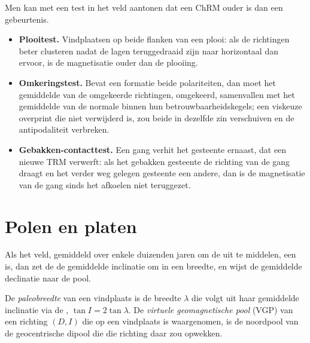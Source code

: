 \begin{method}\label{met:b3:palaeomagnetism:tests}
Men kan met een test in het veld aantonen dat een ChRM ouder is dan een gebeurtenis.
\begin{itemize}
  \item \textbf{Plooitest.} Vindplaatsen op beide flanken van een plooi: als de richtingen
        beter clusteren nadat de lagen teruggedraaid zijn naar horizontaal dan
        ervoor, is de magnetisatie ouder dan de plooiing.
  \item \textbf{Omkeringstest.} Bevat een formatie beide polariteiten, dan moet het gemiddelde
        van de omgekeerde richtingen, omgekeerd, samenvallen met het gemiddelde van
        de normale binnen hun betrouwbaarheidskegels; een viskeuze overprint die
        niet verwijderd is, zou beide in dezelfde zin verschuiven en de antipodaliteit verbreken.
  \item \textbf{Gebakken-contacttest.} Een gang verhit het gesteente ernaast,
        dat een nieuwe TRM verwerft: als het gebakken gesteente de richting van de gang
        draagt en het verder weg gelegen gesteente een andere, dan is de magnetisatie
        van de gang sinds het afkoelen niet teruggezet.
\end{itemize}
\end{method}

\section{Polen en platen}

Als het veld, gemiddeld over enkele duizenden jaren om de  uit te middelen, een  is, dan zet de 
de gemiddelde inclinatie om in een breedte, en wijst de gemiddelde declinatie naar de pool.

\begin{definition}\label{def:b3:palaeomagnetism:vgp}
De \emph{paleobreedte} van een vindplaats is de breedte
$\lambda$ die volgt uit haar gemiddelde inclinatie via de , $\tan I =
2\tan\lambda$. De \emph{virtuele geomagnetische pool}
(VGP) van een richting $(D, I)$ die op een vindplaats is waargenomen, is de noordpool van de
geocentrische dipool die die richting daar zou opwekken.
\end{definition}


